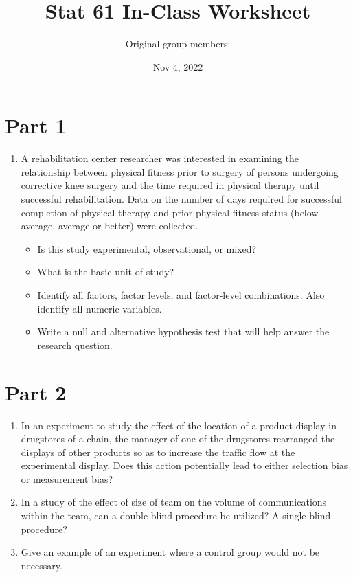 \documentclass[12pt]{article}
\title{Stat 61 In-Class Worksheet}
\date{Nov 4, 2022}
\author{Original group members: }
\begin{document}
\maketitle



\section*{Part 1}


\begin{enumerate}[leftmargin=\labelsep]


\item A rehabilitation center researcher was interested in examining the relationship between physical fitness prior to surgery of persons undergoing corrective knee surgery and the time required in physical therapy until successful rehabilitation. Data on the number of days required for successful completion of physical therapy and prior physical fitness status (below average, average or better) were collected. 

\begin{itemize}
\item Is this study experimental, observational, or mixed? 

\item What is the basic unit of study? 

\item Identify all factors, factor levels, and factor-level combinations. Also identify all numeric variables.  

\item Write a null and alternative hypothesis test that will help answer the research question.

\end{itemize}

\end{enumerate}


\pagebreak 

\section*{Part 2}

\begin{enumerate}[leftmargin=\labelsep]

\item In an experiment to study the effect of the location of a product display in drugstores of a chain, the manager of one of the drugstores rearranged the displays of other products so as to increase the traffic flow at the experimental display. Does this action potentially lead to either selection bias or measurement bias? 

\vspace{3cm}

\item In a study of the effect of size of team on the volume of communications within the team, can a double-blind procedure be utilized? A single-blind procedure?  
\vspace{3cm}

\item Give an example of an experiment where a control group would not be necessary. 

\end{enumerate}
\end{document}
